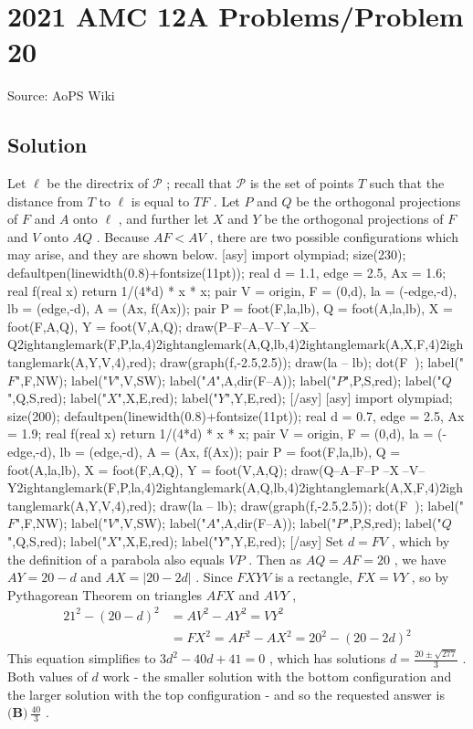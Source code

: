 \documentclass[12pt]{article}
\begin{document}
\section*{{2021 AMC 12A Problems/Problem 20}}
Source: AoPS Wiki

\subsection*{Solution}
Let $\ell$ be the directrix of $\mathcal P$ ; recall that $\mathcal P$ is the set of points $T$ such that the distance from $T$ to $\ell$ is equal to $TF$ . Let $P$ and $Q$ be the orthogonal projections of $F$ and $A$ onto $\ell$ , and further let $X$ and $Y$ be the orthogonal projections of $F$ and $V$ onto $AQ$ . Because $AF < AV$ , there are two possible configurations which may arise, and they are shown below. [asy] import olympiad; size(230); defaultpen(linewidth(0.8)+fontsize(11pt)); real d = 1.1, edge = 2.5, Ax = 1.6; real f(real x) { return 1/(4*d) * x * x; } pair V = origin, F = (0,d), la = (-edge,-d), lb = (edge,-d), A = (Ax, f(Ax)); pair P = foot(F,la,lb), Q = foot(A,la,lb), X = foot(F,A,Q), Y = foot(V,A,Q); draw(P--F--A--V--Y^^F--X--Q^^rightanglemark(F,P,la,4)^^rightanglemark(A,Q,lb,4)^^rightanglemark(A,X,F,4)^^rightanglemark(A,Y,V,4),red); draw(graph(f,-2.5,2.5)); draw(la -- lb); dot(F^^A^^V); label("$F$",F,NW); label("$V$",V,SW); label("$A$",A,dir(F--A)); label("$P$",P,S,red); label("$Q$",Q,S,red); label("$X$",X,E,red); label("$Y$",Y,E,red); [/asy] [asy] import olympiad; size(200); defaultpen(linewidth(0.8)+fontsize(11pt)); real d = 0.7, edge = 2.5, Ax = 1.9; real f(real x) { return 1/(4*d) * x * x; } pair V = origin, F = (0,d), la = (-edge,-d), lb = (edge,-d), A = (Ax, f(Ax)); pair P = foot(F,la,lb), Q = foot(A,la,lb), X = foot(F,A,Q), Y = foot(V,A,Q); draw(Q--A--F--P^^F--X^^A--V--Y^^rightanglemark(F,P,la,4)^^rightanglemark(A,Q,lb,4)^^rightanglemark(A,X,F,4)^^rightanglemark(A,Y,V,4),red); draw(la -- lb); draw(graph(f,-2.5,2.5)); dot(F^^A^^V); label("$F$",F,NW); label("$V$",V,SW); label("$A$",A,dir(F--A)); label("$P$",P,S,red); label("$Q$",Q,S,red); label("$X$",X,E,red); label("$Y$",Y,E,red); [/asy] Set $d = FV$ , which by the definition of a parabola also equals $VP$ . Then as $AQ = AF = 20$ , we have $AY = 20 - d$ and $AX = |20 - 2d|$ . Since $FXYV$ is a rectangle, $FX = VY$ , so by Pythagorean Theorem on triangles $AFX$ and $AVY$ , \begin{align*} 21^2 - (20 - d)^2 &= AV^2 - AY^2 = VY^2\\ &= FX^2 = AF^2 - AX^2 = 20^2 - (20 - 2d)^2 \end{align*} This equation simplifies to $3d^2 - 40d + 41 = 0$ , which has solutions $d = \tfrac{20\pm\sqrt{277}}3$ . Both values of $d$ work - the smaller solution with the bottom configuration and the larger solution with the top configuration - and so the requested answer is $\boxed{\textbf{(B)}\ \tfrac{40}{3}}$ .
\end{document}
